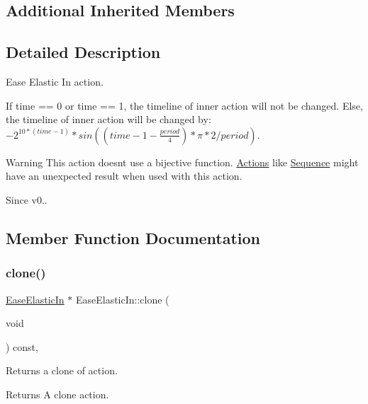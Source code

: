 \subsection*{Additional Inherited Members}


\subsection{Detailed Description}
Ease Elastic In action. 

If time == 0 or time == 1, the timeline of inner action will not be changed. Else, the timeline of inner action will be changed by\+: $-{ 2 }^{ 10*(time-1) }*sin((time-1-\frac { period }{ 4 } )*\pi *2/period)$.

\begin{DoxyWarning}{Warning}
This action doesn\textquotesingle{}t use a bijective function. \hyperlink{classActions}{Actions} like \hyperlink{classSequence}{Sequence} might have an unexpected result when used with this action. 
\end{DoxyWarning}
\begin{DoxySince}{Since}
v0.. 
\end{DoxySince}


\subsection{Member Function Documentation}
\mbox{\label{classEaseElasticIn_af0095a2934fe5ba057205638349c132f}} 
\subsubsection{\texorpdfstring{clone()}{clone()}}
{\footnotesize\ttfamily \hyperlink{classEaseElasticIn}{Ease\+Elastic\+In} $\ast$ Ease\+Elastic\+In\+::clone (\begin{DoxyParamCaption}\item[{void}]{ }\end{DoxyParamCaption}) const\hspace{0.3cm}{\ttfamily [override]}, {\ttfamily [virtual]}}

Returns a clone of action.

\begin{DoxyReturn}{Returns}
A clone action. 
\end{DoxyReturn}


